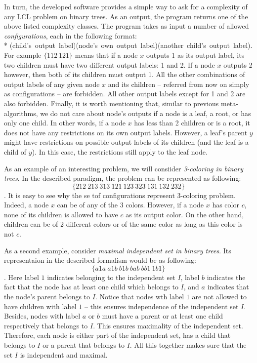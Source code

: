 In turn, the developed software provides a simple way to ask for a complexity
of any LCL problem on binary trees. As an output, the program returns
one of the above listed complexity classes. The program takes as input a
number of allowed \emph{configurations}, each in the following format:\\*
\mbox{(child's~output~label)(node's~own~output~label)(another~child's~output~label)}.
For example $\{112~121\}$ means that if a node $x$ outputs 1 as its output label,
its two children must have two different output labels: 1 and 2. If
a node $x$ outputs 2 however, then both of its children must output 1.
All the other combinations of output labels of any given node $x$ and
its children -- referred from now on simply as configurations --
are forbidden. All other output labels except for 1 and 2 are also
forbidden. Finally, it is worth mentioning that, similar to previous
meta-algorithms, we do not care about node's outputs if a node is a leaf,
a root, or has only one child. In other words, if a node $x$ has less than
2 children or is a root, it
does not have any restrictions on its own output labels. However, a leaf's parent $y$ might have restrictions on possible output labels of its children
(and the leaf is a child of $y$). In this case, the restrictions still
apply to the leaf node.

As an example of an interesting problem, we will consiider
\emph{3-coloring in binary trees}. In the described paradigm,
the problem can be represented as following:
$$\{212~213~313~121~123~323~131~132~232\}$$.
It is easy to see why the se tof configurations represent
3-coloring problem. Indeed, a node $x$ can be of any of the 3
colors. However, if a node $x$ has color $c$, none of its
children is allowed to have $c$ as its output color. On the
other hand, children can be of 2 different colors or of the same
color as long as this color is not $c$.

As a second example, consider \emph{maximal independent set in
binary trees}. Its representaion in the described formalism would be
as following:
$$\{a1a~a1b~b1b~bab~bb1~1b1\}$$.
Here label $1$ indicates belonging to the independent set $I$, label $b$
indicates the fact that the node has at least one child which belongs to
$I$, and $a$ indicates that the node's parent belongs to $I$.
Notice that nodes wth label $1$ are not allowed to have children with
label $1$ -- this ensures independence of the independent set $I$.
Besides, nodes with label $a$ or $b$ must have a parent or at least one
child respectively that belongs to $I$. This ensures maximality of the
independent set.
Therefore,
each node is either part of the independent set, has a child that belongs
to $I$ or a parent that belongs to $I$. All this together makes sure
that the set $I$ is independent and maximal.

